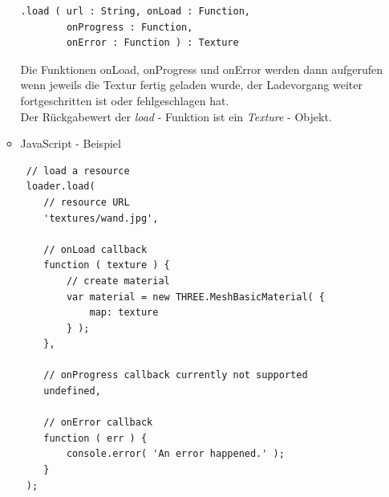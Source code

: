 \begin{itemize}
\begin{itemize}
\begin{lstlisting}
.load ( url : String, onLoad : Function,
        onProgress : Function,
        onError : Function ) : Texture
\end{lstlisting}

Die Funktionen onLoad, onProgress und onError werden dann aufgerufen wenn jeweils die Textur fertig geladen wurde, der Ladevorgang weiter fortgeschritten ist oder fehlgeschlagen hat. \\
Der Rückgabewert der \textit{load} - Funktion ist ein \textit{Texture} - Objekt.

\item JavaScript - Beispiel
\begin{lstlisting}
 // load a resource
 loader.load(
    // resource URL
    'textures/wand.jpg',

    // onLoad callback
    function ( texture ) {
        // create material
        var material = new THREE.MeshBasicMaterial( {
            map: texture
        } );
    },

    // onProgress callback currently not supported
    undefined,

    // onError callback
    function ( err ) {
        console.error( 'An error happened.' );
    }
 );
\end{lstlisting}
\end{itemize}
\end{itemize}

\newpage
\clearpage
